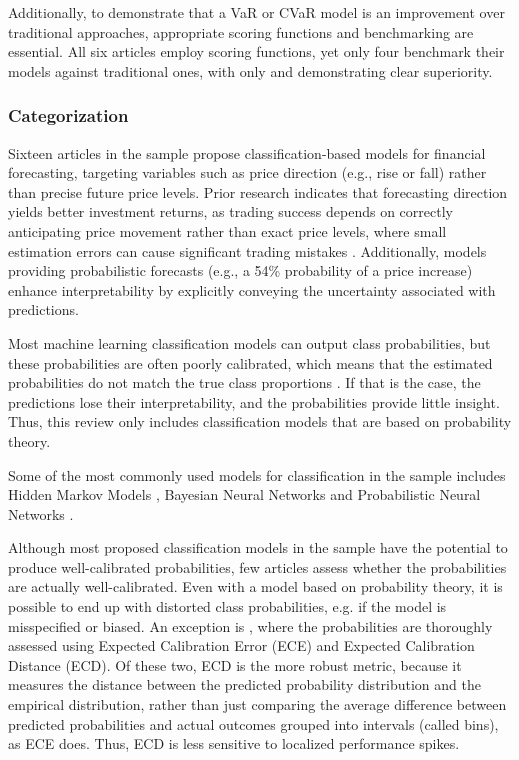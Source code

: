 Additionally, to demonstrate that a VaR or CVaR model is an improvement over traditional approaches, appropriate scoring functions and benchmarking are essential. All six articles employ scoring functions, yet only four benchmark their models against traditional ones, with only \textcite{Fatouros2023DeepVaR} and \textcite{Horenko2020} demonstrating clear superiority.





\subsubsection{Categorization}
Sixteen articles in the sample propose classification-based models for financial forecasting, targeting variables such as price direction (e.g., rise or fall) rather than precise future price levels. Prior research indicates that forecasting direction yields better investment returns, as trading success depends on correctly anticipating price movement rather than exact price levels, where small estimation errors can cause significant trading mistakes \parencite{Enke2005}. Additionally, models providing probabilistic forecasts (e.g., a 54\% probability of a price increase) enhance interpretability by explicitly conveying the uncertainty associated with predictions.

Most machine learning classification models can output class probabilities, but these probabilities are often poorly calibrated, which means that the estimated probabilities do not match the true class proportions \parencite{guo2017calibration, NiculescuMizil2005}. If that is the case, the predictions lose their interpretability, and the probabilities provide little insight. Thus, this review only includes classification models that are based on probability theory.

Some of the most commonly used models for classification in the sample includes Hidden Markov Models \parencite{sher2023exploiting, park2011trend, zhang2019high, su2022hmm,cao2019multi}, Bayesian Neural Networks \parencite{Malagrino2018Forecasting, magris2023bayesian} and Probabilistic Neural Networks \parencite{Thawornwong2004pnn, Lahmiri2024pnn, Chandrasekara2019pnn}.

Although most proposed classification models in the sample have the potential to produce well-calibrated probabilities, few articles assess whether the probabilities are actually well-calibrated. Even with a model based on probability theory, it is possible to end up with distorted class probabilities, e.g. if the model is misspecified or biased. An exception is \textcite{magris2023bayesian}, where the probabilities are thoroughly assessed using Expected Calibration Error (ECE) and Expected Calibration Distance (ECD). Of these two, ECD is the more robust metric, because it measures the distance between the predicted probability distribution and the empirical distribution, rather than just comparing the average difference between predicted probabilities and actual outcomes grouped into intervals (called bins), as ECE does. Thus, ECD is less sensitive to localized performance spikes.

